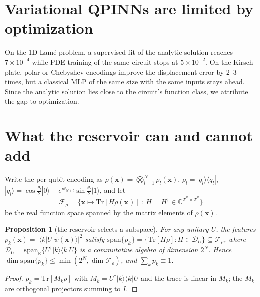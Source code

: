 \documentclass[11pt]{article}
\newtheorem{proposition}{Proposition}
\theoremstyle{remark}\newtheorem*{remark}{Remark}
\begin{document}
\section{Variational QPINNs are limited by optimization}\label{sec:vqpinn}
On the 1D Lam\'e problem, a supervised fit of the analytic solution reaches $7\times10^{-4}$ while PDE training of
the same circuit stops at $5\times10^{-2}$. On the Kirsch plate, polar or Chebyshev encodings improve the
displacement error by 2--3 times, but a classical MLP of the same size with the same inputs stays ahead.
Since the analytic solution lies close to the circuit's function class, we attribute the gap to optimization.

\section{What the reservoir can and cannot add}\label{sec:theory}
Write the per-qubit encoding as $\rho(\bm x)=\bigotimes_{l=1}^N\rho_l(\bm x)$, $\rho_l=|q_l\rangle\langle q_l|$,
$|q_l\rangle=\cos\tfrac{\theta_l}{2}|0\rangle+e^{i\theta_{N+l}}\sin\tfrac{\theta_l}{2}|1\rangle$, and let
\begin{equation}
  \mathcal F_\rho=\big\{\bm x\mapsto\mathrm{Tr}[H\rho(\bm x)]\ :\ H=H^\dagger\in\mathbb C^{2^N\times2^N}\big\}
\end{equation}
be the real function space spanned by the matrix elements of $\rho(\bm x)$.

\begin{proposition}[the reservoir selects a subspace]\label{prop:span}
For any unitary $U$, the features $p_k(\bm x)=|\langle k|U|\psi(\bm x)\rangle|^2$ satisfy
$\mathrm{span}\{p_k\}=\{\mathrm{Tr}[H\rho]:H\in\mathcal D_U\}\subseteq\mathcal F_\rho$, where
$\mathcal D_U=\mathrm{span}_{\mathbb R}\{U^\dagger|k\rangle\langle k|U\}$ is a commutative algebra of dimension $2^N$.
Hence $\dim\mathrm{span}\{p_k\}\le\min(2^N,\dim\mathcal F_\rho)$, and $\sum_kp_k\equiv1$.
\end{proposition}
\begin{proof}
$p_k=\mathrm{Tr}[M_k\rho]$ with $M_k=U^\dagger|k\rangle\langle k|U$ and the trace is linear in $M_k$;
the $M_k$ are orthogonal projectors summing to $I$.
\end{proof}
\end{document}
